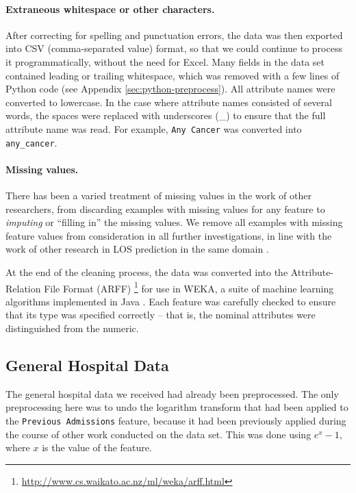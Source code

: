 \paragraph{Extraneous whitespace or other characters.}
After correcting for spelling and punctuation errors,
the data was then exported into CSV (comma-separated value) format, so that
we could continue to process it programmatically, without the need for
Excel. Many fields in the data set contained leading or trailing whitespace,
which was removed with a few lines of Python code (see Appendix
\ref{sec:python-preprocess}).
All attribute names were converted to lowercase. In the case
where attribute names consisted of several words, the spaces were replaced
with underscores (\_) to ensure that the full attribute name was read.
For example, \texttt{Any Cancer} was converted into \texttt{any\_cancer}.

\paragraph{Missing values.}
There has been a varied treatment of missing values in the work of other
researchers, from discarding examples with missing values for any feature
to \textit{imputing} or ``filling in'' the missing values. We remove all
examples with missing feature values from consideration in all further
investigations, in line with the work of other research in LOS prediction
in the same domain \cite{Dinh2013a}.

At the end of the cleaning process, the data was converted into the
Attribute-Relation File Format (ARFF)
\footnote{\url{http://www.cs.waikato.ac.nz/ml/weka/arff.html}} for use in
WEKA, a suite of machine learning algorithms implemented in Java
\cite{Hall2009}. Each feature was carefully checked to ensure that its
type was specified correctly -- that is, the nominal attributes were
distinguished from the numeric.

\subsection{General Hospital Data}
The general hospital data we received had already been preprocessed. The only
preprocessing here was to
undo the logarithm transform that had been applied to the \texttt{Previous
Admissions} feature, because it had been previously applied during the course
of other work conducted on the data set. This was done using $e^x-1$, where
$x$ is the value of the feature. 

